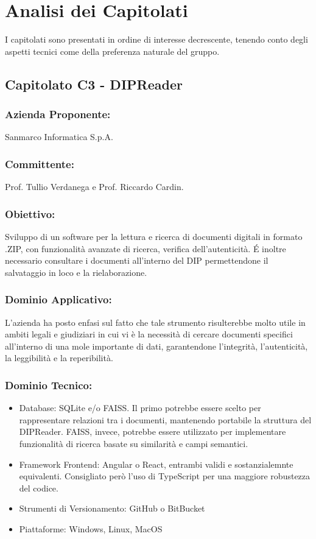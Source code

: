\documentclass[a4paper,12pt]{article}
\begin{document}
\section{Analisi dei Capitolati}
I capitolati sono presentati in ordine di interesse decrescente, tenendo conto
degli aspetti tecnici come della preferenza naturale del gruppo.

\subsection{ Capitolato C3 - DIPReader}
\subsubsection*{Azienda Proponente:} Sanmarco Informatica S.p.A.
\subsubsection*{Committente:} Prof. Tullio Verdanega e Prof. Riccardo Cardin.
\subsubsection*{Obiettivo:} Sviluppo di un software per la lettura e ricerca di documenti digitali in formato .ZIP, con funzionalità avanzate di ricerca, verifica dell'autenticità. É inoltre necessario consultare i documenti all'interno del DIP permettendone il salvataggio in loco e la rielaborazione.
\subsubsection*{Dominio Applicativo:} L'azienda ha posto enfasi sul fatto che tale strumento risulterebbe molto utile in ambiti legali e giudiziari in cui vi è la necessità di cercare documenti specifici all'interno di una mole importante di dati, garantendone l'integrità, l'autenticità, la leggibilità  e la reperibilità.
\subsubsection*{Dominio Tecnico:}
\begin{itemize}
    \item Database: SQLite e/o FAISS. Il primo potrebbe essere scelto per rappresentare relazioni tra i documenti, mantenendo portabile la struttura del DIPReader. FAISS, invece, potrebbe essere utilizzato per implementare funzionalità di ricerca basate su similarità e campi semantici.
    \item Framework Frontend: Angular o React, entrambi validi e sostanzialemnte equivalenti. Consigliato però l'uso di TypeScript per una maggiore robustezza del codice.
    \item Strumenti di Versionamento: GitHub o BitBucket
    \item Piattaforme: Windows, Linux, MacOS
\end{itemize}
\end{document}
